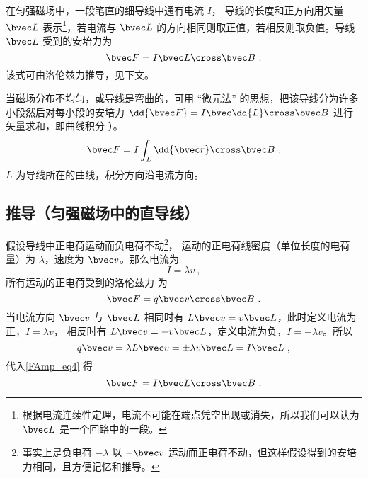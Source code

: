 

在匀强磁场中，一段笔直的细导线中通有电流 $I$， 导线的长度和正方向用矢量 $\bvec L$ 表示\footnote{根据电流连续性定理，电流不可能在端点凭空出现或消失，所以我们可以认为 $\bvec L$ 是一个回路中的一段。}，若电流与 $\bvec L$ 的方向相同则取正值，若相反则取负值。导线 $\bvec L$ 受到的安培力为
\begin{equation}\label{FAmp_eq1}
\bvec F = I \bvec L \cross \bvec B~.
\end{equation}
该式可由洛伦兹力推导，见下文。

当磁场分布不均匀，或导线是弯曲的，可用 “微元法” 的思想，把该导线分为许多小段然后对每小段的安培力 $\dd{\bvec F} = I\bvec \dd{L} \cross\bvec B$ 进行矢量求和，即曲线积分%
）。
\begin{equation}
\bvec F = I\int_L \dd{\bvec r} \cross \bvec B~,
\end{equation}
$L$ 为导线所在的曲线，积分方向沿电流方向。

\subsection{推导（匀强磁场中的直导线）}
假设导线中正电荷运动而负电荷不动\footnote{事实上是负电荷 $-\lambda$ 以 $-\bvec v$ 运动而正电荷不动，但这样假设得到的安培力相同，且方便记忆和推导。}， 运动的正电荷线密度（单位长度的电荷量）为 $\lambda$，速度为 $\bvec v$。那么电流为%
\begin{equation}
I = \lambda v~,
\end{equation}
所有运动的正电荷受到的洛伦兹力%
为
\begin{equation}\label{FAmp_eq4}
\bvec F =  q\bvec v \cross \bvec B~.
\end{equation}
当电流方向 $\bvec v$ 与 $\bvec L$ 相同时有 $L \bvec v = v \bvec L$，此时定义电流为正，$I = \lambda v$， 相反时有 $L \bvec v = -v\bvec L$，定义电流为负，$I = -\lambda v$。所以
\begin{equation}
q\bvec v = \lambda L \bvec v = \pm \lambda v\bvec L= I \bvec L~,
\end{equation}
代入\autoref{FAmp_eq4} 得
\begin{equation}
\bvec F = I \bvec L \cross \bvec B~.
\end{equation}
